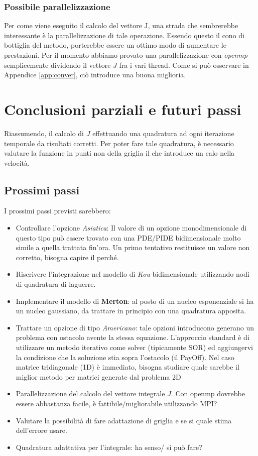 \documentclass[a4paper,10pt]{article}
\begin{document}
\subsubsection{Possibile parallelizzazione}
Per come viene eseguito il calcolo del vettore J, una strada che sembrerebbe interessante è la parallelizzazione di tale operazione. Essendo questo il cono di bottiglia del metodo, porterebbe essere un ottimo modo di aumentare le prestazioni. Per il momento abbiamo provato una parallelizzazione con \emph{openmp} semplicemente dividendo il vettore $J$ fra i vari thread. Come si può osservare in Appendice \ref{app:conver}, ciò introduce una buona miglioria.

\section{Conclusioni parziali e futuri passi}

Riassumendo, il calcolo di $J$ effettuando una quadratura ad ogni iterazione temporale da risultati corretti. Per poter fare tale quadratura, è necessario valutare la funzione in punti non della griglia il che introduce un calo nella velocità.

\subsection{Prossimi passi}
I prossimi passi previsti sarebbero:
\begin{itemize}
 \item Controllare l'opzione \emph{Asiatica}: Il valore di un opzione monodimensionale di questo tipo può essere trovato con una PDE/PIDE bidimensionale molto simile a quella trattata fin'ora. Un primo tentativo restituisce un valore non corretto, bisogna capire il perché.
 \item Riscrivere l'integrazione nel modello di \emph{Kou} bidimensionale utilizzando nodi di quadratura di laguerre.
 \item Implementare il modello di \textbf{Merton}: al posto di un nucleo esponenziale si ha un nucleo gaussiano, da trattare in principio con una quadratura apposita.
 \item Trattare un opzione di tipo \emph{Americano}: tale opzioni introducono generano un problema con ostacolo avente la stessa equazione. L'approccio standard è di utilizzare un metodo iterativo come solver (tipicamente SOR) ed aggiungervi la condizione che la soluzione stia sopra l'ostacolo (il PayOff). Nel caso matrice tridiagonale (1D) è immediato, bisogna studiare quale sarebbe il miglior metodo per matrici generate dal problema 2D
 \item Parallelizzazione del calcolo del vettore integrale $J$. Con openmp dovrebbe essere abbastanza facile, è fattibile/migliorabile utilizzando MPI?
 \item Valutare la possibilità di fare adattazione di griglia e se si quale stima dell'errore usare.
 \item Quadratura adattativa per l'integrale: ha senso/ si può fare?
\end{itemize}
\end{document}
